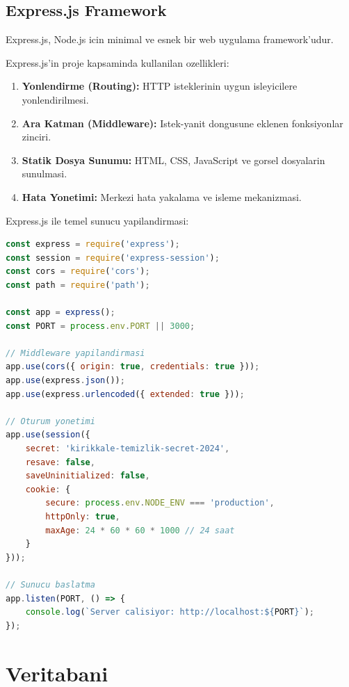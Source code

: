 \subsection{Express.js Framework}
\label{subsec:expressjs}

Express.js, Node.js icin minimal ve esnek bir web uygulama 
framework'udur.

Express.js'in proje kapsaminda kullanilan ozellikleri:

\begin{enumerate}
    \item \textbf{Yonlendirme (Routing):} HTTP isteklerinin 
    uygun isleyicilere yonlendirilmesi.
    \item \textbf{Ara Katman (Middleware):} Istek-yanit dongusune 
    eklenen fonksiyonlar zinciri.
    \item \textbf{Statik Dosya Sunumu:} HTML, CSS, JavaScript ve 
    gorsel dosyalarin sunulmasi.
    \item \textbf{Hata Yonetimi:} Merkezi hata yakalama ve 
    isleme mekanizmasi.
\end{enumerate}

Express.js ile temel sunucu yapilandirmasi:

\begin{lstlisting}[language=JavaScript, caption={Express.js Sunucu Yapilandirmasi}]
const express = require('express');
const session = require('express-session');
const cors = require('cors');
const path = require('path');

const app = express();
const PORT = process.env.PORT || 3000;

// Middleware yapilandirmasi
app.use(cors({ origin: true, credentials: true }));
app.use(express.json());
app.use(express.urlencoded({ extended: true }));

// Oturum yonetimi
app.use(session({
    secret: 'kirikkale-temizlik-secret-2024',
    resave: false,
    saveUninitialized: false,
    cookie: {
        secure: process.env.NODE_ENV === 'production',
        httpOnly: true,
        maxAge: 24 * 60 * 60 * 1000 // 24 saat
    }
}));

// Sunucu baslatma
app.listen(PORT, () => {
    console.log(`Server calisiyor: http://localhost:${PORT}`);
});
\end{lstlisting}

\section{Veritabani}
\label{sec:veritabani}

